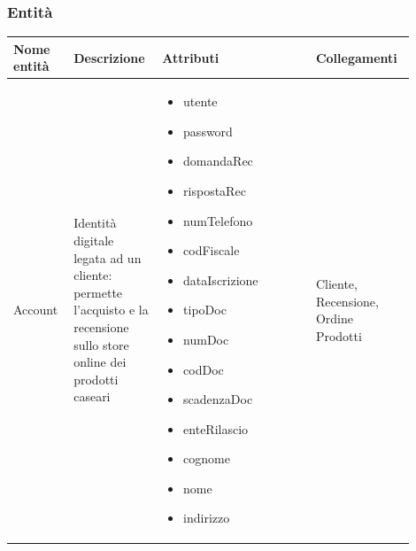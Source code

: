 \documentclass[12pt,a4paper]{article}
\begin{document}
\subsubsection{Entità}
\label{Store Entita}
\begin{center}
\setlength{\extrarowheight}{1.5pt}
\begin{longtable}{|p{0.14\linewidth}|p{0.20\linewidth}|p{0.36\linewidth}|p{0.20\linewidth}|}
\hline 
\textbf{Nome entità} 	& \textbf{Descrizione} & \textbf{Attributi} & \textbf{Collegamenti}\\ 

\hline

    
\hline

Account 				& \begin{flushleft}\vspace{-15pt} Identità digitale legata ad un cliente: permette l'acquisto e la recensione sullo store online dei prodotti caseari  \end{flushleft}
					& \begin{itemize}
						\setlength{\itemindent}{-1em}
						\vspace{-25pt}
						\setlength\itemsep{-0.25em}
						\item utente
						\item password
						\item domandaRec
						\item rispostaRec
						\item numTelefono
						\item codFiscale
						\item dataIscrizione
						\item tipoDoc
						\item numDoc
						\item codDoc
						\item scadenzaDoc
						\item enteRilascio
						\item cognome
						\item nome
						\item indirizzo
						
					\end{itemize}
					& \begin{flushleft}\vspace{-25pt} Cliente, Recensione, Ordine Prodotti \end{flushleft} \\ 


\end{longtable}
\end{center}
\end{document}
